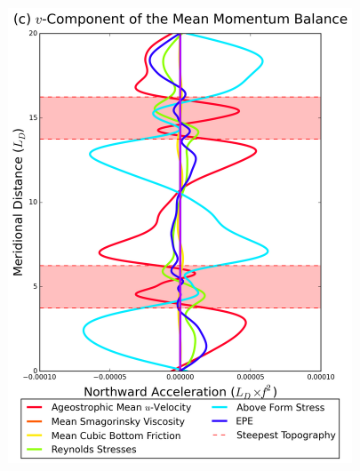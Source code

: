 \documentclass[12pt,a4paper]{report}
\begin{document}
\begin{figure}
\begin{subfigure}{0.46\linewidth}
 		\includegraphics[width=\linewidth ]{vmom_1}
 		\label{fig:vmomlayer1}
 	\end{subfigure}
 	\quad
 	\begin{subfigure}{0.46\linewidth}
 		\centering

\end{subfigure}
\end{figure}
\end{document}
